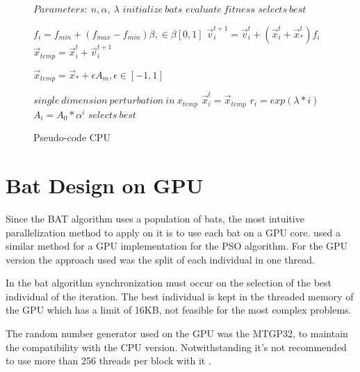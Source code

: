 \documentclass[conference]{IEEEtran}
\begin{document}
\begin{figure}
\begin{algorithmic}[1]
\State $Parameters:\ n,\alpha,\ \lambda$
\State $initialize\ bats$
\State $evaluate\ fitness$
\State $selects\ best$

        \State $f_i=f_{min} + (f_{max} - f_{min})\beta, \in \beta [0,1]$
        \State $\vec{v}_i^{t+1} = \vec{v}_i^{t} + (\vec{x}_i^{t} + \vec{x}_*^{t})f_i$
        \State $\vec{x}_{temp} = \vec{x}_i^{t} + \vec{v}_i^{t+1}$


            \State $\vec{x}_{temp} = \vec{x}_* + \epsilon A_m, \epsilon \in [-1, 1]$
        \EndIf

        \State $single\ dimension\ perturbation\ in\ x_{temp}$
            \State $\vec{x}_i^t = \vec{x}_{temp}$
            \State $r_i = exp(\lambda * i)$
            \State $A_i =  A_{0} * \alpha^i$
        \EndIf
        \State $selects\ best$
    \EndFor
\EndWhile
\end{algorithmic}
\caption{Pseudo-code CPU}\label{GPU}
\end{figure}


\section{Bat Design on GPU}

Since the BAT algorithm uses a population of bats, the most intuitive
parallelization method to apply on it is to use each bat on a GPU core.
\cite{pso-gpu} used a similar method for a GPU implementation for the PSO algorithm.
For the GPU version the approach used was the split of each individual in one thread.

In the bat algorithm synchronization must occur on the selection of the best individual of the iteration. The best individual is kept in the threaded memory of the GPU which has a limit of 16KB, not feasible for the most complex problems.

The random number generator used on the GPU was the MTGP32, to
maintain the compatibility with the CPU version. Notwithstanding it's
not recommended to use more than 256 threads per block with it
\cite{curandIssue}.
\end{document}
